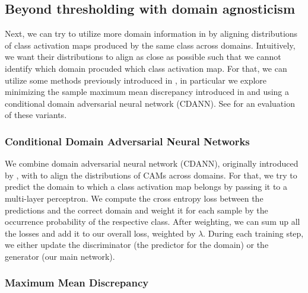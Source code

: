\subsection{Beyond thresholding with domain agnosticism}
Next, we can try to utilize more domain information in \divcam by aligning distributions of class activation maps produced by the same class across domains. Intuitively, we want their distributions to align as close as possible such that we cannot identify which domain procuded which class activation map. For that, we can utilize some methods previously introduced in , in particular we explore minimizing the sample maximum mean discrepancy introduced in  and using a conditional domain adversarial neural network (CDANN). See  for an evaluation of these variants.

\subsubsection{Conditional Domain Adversarial Neural Networks}
We combine domain adversarial neural network (CDANN), originally introduced by \citet{LiGTLT18}, with \divcam to align the distributions of CAMs across domains. For that, we try to predict the domain to which a class activation map belongs by passing it to a multi-layer perceptron. We compute the cross entropy loss between the predictions and the correct domain and weight it for each sample by the occurrence probability of the respective class. After weighting, we can sum up all the losses and add it to our overall loss, weighted by $\lambda$. During each training step, we either update the discriminator (the predictor for the domain) or the generator (our main network). 

\subsubsection{Maximum Mean Discrepancy}

